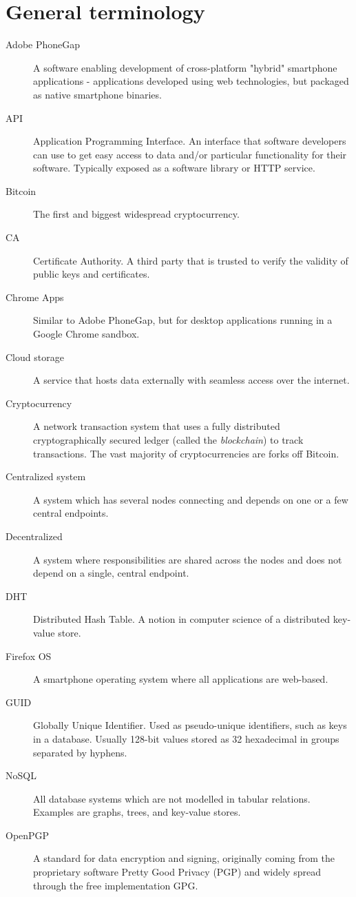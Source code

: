 \section{General terminology}
\begin{description}
  \item[Adobe PhoneGap] A software enabling development of cross-platform "hybrid" smartphone applications - applications developed using web technologies, but packaged as native smartphone binaries.
  \item[API] Application Programming Interface. An interface that software developers can use to get easy access to data and/or particular functionality for their software. Typically exposed as a software library or HTTP service.
  \item[Bitcoin] The first and biggest widespread cryptocurrency.
  \item[CA] Certificate Authority. A third party that is trusted to verify the validity of public keys and certificates.
  \item[Chrome Apps] Similar to Adobe PhoneGap, but for desktop applications running in a Google Chrome sandbox.
  \item[Cloud storage] A service that hosts data externally with seamless access over the internet.
  \item[Cryptocurrency] A network transaction system that uses a fully distributed cryptographically secured ledger (called the \emph{blockchain}) to track transactions. The vast majority of cryptocurrencies are forks off Bitcoin.
  \item[Centralized system] A system which has several nodes connecting and depends on one or a few central endpoints.
  \item[Decentralized] A system where responsibilities are shared across the nodes and does not depend on a single, central endpoint.
  \item[DHT] Distributed Hash Table. A notion in computer science of a distributed key-value store.
  \item[Firefox OS] A smartphone operating system where all applications are web-based.
  \item[GUID] Globally Unique Identifier. Used as pseudo-unique identifiers, such as keys in a database. Usually 128-bit values stored as 32 hexadecimal in groups separated by hyphens.
  \item[NoSQL] All database systems which are not modelled in tabular relations. Examples are graphs, trees, and key-value stores.
  \item[OpenPGP] A standard for data encryption and signing, originally coming from the proprietary software Pretty Good Privacy (PGP) and widely spread through the free implementation GPG.

\end{description}
